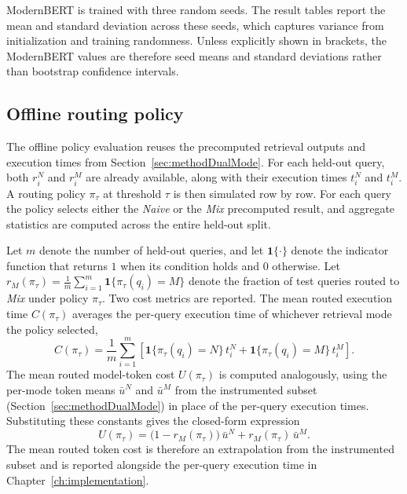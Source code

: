 \documentclass[english, bibtex]{kththesis}               %
\numberwithin{listing}{chapter}
\begin{document}
ModernBERT is trained with three random seeds. The result tables report the mean and standard deviation across these seeds, which captures variance from initialization and training randomness. Unless explicitly shown in brackets, the ModernBERT values are therefore seed means and standard deviations rather than bootstrap confidence intervals.

\subsection{Offline routing policy}
\label{sec:methodOfflinePolicy}

The offline policy evaluation reuses the precomputed retrieval outputs and execution times from Section~\ref{sec:methodDualMode}. For each held-out query, both \(r_i^N\) and \(r_i^M\) are already available, along with their execution times \(t_i^N\) and \(t_i^M\). A routing policy \(\pi_\tau\) at threshold \(\tau\) is then simulated row by row. For each query the policy selects either the \emph{Naive} or the \emph{Mix} precomputed result, and aggregate statistics are computed across the entire held-out split.

Let \(m\) denote the number of held-out queries, and let \(\mathbf{1}\{\cdot\}\) denote the indicator function that returns \(1\) when its condition holds and \(0\) otherwise. Let \(r_M(\pi_\tau) = \tfrac{1}{m}\sum_{i=1}^{m} \mathbf{1}\{\pi_\tau(q_i)=M\}\) denote the fraction of test queries routed to \emph{Mix} under policy \(\pi_\tau\). Two cost metrics are reported. The mean routed execution time \(C(\pi_\tau)\) averages the per-query execution time of whichever retrieval mode the policy selected,
\begin{equation}
\label{eq:averageRoutedTime}
C(\pi_\tau) =
\frac{1}{m}\sum_{i=1}^{m}
\left[
\mathbf{1}\{\pi_\tau(q_i)=N\}\,t_i^N
+ \mathbf{1}\{\pi_\tau(q_i)=M\}\,t_i^M
\right].
\end{equation}
The mean routed model-token cost \(U(\pi_\tau)\) is computed analogously, using the per-mode token means \(\bar{u}^N\) and \(\bar{u}^M\) from the instrumented subset (Section~\ref{sec:methodDualMode}) in place of the per-query execution times. Substituting these constants gives the closed-form expression
\begin{equation}
\label{eq:averageRoutedTokens}
U(\pi_\tau) = \bigl(1 - r_M(\pi_\tau)\bigr)\,\bar{u}^N + r_M(\pi_\tau)\,\bar{u}^M.
\end{equation}
The mean routed token cost is therefore an extrapolation from the instrumented subset and is reported alongside the per-query execution time in Chapter~\ref{ch:implementation}.
\end{document}
